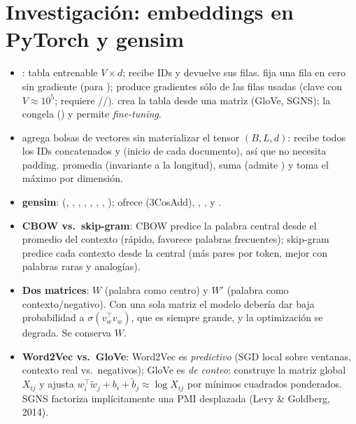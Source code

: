 \section{Investigación: embeddings en PyTorch y gensim}
\begin{itemize}
  \item {}: tabla entrenable $V\times d$; recibe IDs y
  devuelve sus filas.  fija una fila en cero sin gradiente (para ); 
  produce gradientes sólo de las filas usadas (clave con $V\approx10^5$; requiere //).
   crea la tabla desde una matriz (GloVe, SGNS);  la congela
  () y  permite \emph{fine-tuning}.
  \item {} agrega bolsas de vectores sin materializar el tensor $(B,L,d)$: recibe todos los IDs
  concatenados y  (inicio de cada documento), así que no necesita padding.  promedia (invariante a la
  longitud),  suma (admite ) y  toma el máximo por dimensión.
  \item \textbf{gensim}:  (, , , , ,
  , , );  ofrece  (3CosAdd), ,
  ,  y .
  \item \textbf{CBOW vs.\ skip-gram}: CBOW predice la palabra central desde el promedio del contexto (rápido, favorece palabras
  frecuentes); skip-gram predice cada contexto desde la central (más pares por token, mejor con palabras raras y analogías).
  \item \textbf{Dos matrices}: $W$ (palabra como centro) y $W'$ (palabra como contexto/negativo). Con una sola matriz el modelo
  debería dar baja probabilidad a $\sigma(v_w^\top v_w)$, que es siempre grande, y la optimización se degrada. Se conserva $W$.
  \item \textbf{Word2Vec vs.\ GloVe}: Word2Vec es \emph{predictivo} (SGD local sobre ventanas, contexto real vs.\ negativos);
  GloVe es \emph{de conteo}: construye la matriz global $X_{ij}$ y ajusta $w_i^\top\tilde w_j+b_i+\tilde b_j\approx\log X_{ij}$
  por mínimos cuadrados ponderados. SGNS factoriza implícitamente una PMI desplazada (Levy \& Goldberg, 2014).
\end{itemize}
